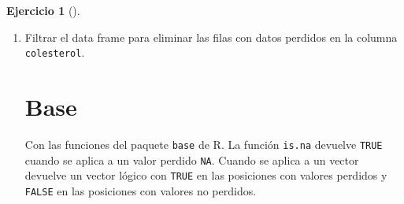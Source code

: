 \documentclass[
  spanish,
  a4paper,
]{scrreport}
\theoremstyle{definition}
\newtheorem{exercise}{Ejercicio}[chapter]
\theoremstyle{remark}
\begin{document}
\begin{exercise}[]
\begin{enumerate}
\begin{tcolorbox}
\begin{verbatim}
# A tibble: 12 x 8
   nombre                      edad sexo   peso altura colesterol   imc Obesidad
   <chr>                      <dbl> <chr> <dbl>  <dbl>      <dbl> <dbl> <fct>   
 1 José Luis Martínez Izquie~    18 H        85   1.79        182    27 Sobrepe~
 2 Rosa Díaz Díaz                32 M        65   1.73        232    22 Saludab~
 3 Carmen López Pinzón           35 M        65   1.7         200    22 Saludab~
 4 Marisa López Collado          46 M        51   1.58        148    20 Saludab~
 5 Antonio Ruiz Cruz             68 H        66   1.74        249    22 Saludab~
 6 Antonio Fernández Ocaña       51 H        62   1.72        276    21 Saludab~
 7 Pedro Gálvez Tenorio          35 H        90   1.94        241    24 Saludab~
 8 Santiago Reillo Manzano       46 H        75   1.85        280    22 Saludab~
 9 Macarena Álvarez Luna         53 M        55   1.62        262    21 Saludab~
10 José María de la Guía Sanz    58 H        78   1.87        198    22 Saludab~
11 Miguel Angel Cuadrado Gut~    27 H       109   1.98        210    28 Sobrepe~
12 Carolina Rubio Moreno         20 M        61   1.77        194    19 Saludab~
\end{verbatim}

  \end{tcolorbox}
\item
  Filtrar el data frame para eliminar las filas con datos perdidos en la
  columna \texttt{colesterol}.

  \begin{tcolorbox}[enhanced jigsaw, titlerule=0mm, arc=.35mm, rightrule=.15mm, opacitybacktitle=0.6, leftrule=.75mm, colframe=quarto-callout-tip-color-frame, toptitle=1mm, breakable, colbacktitle=quarto-callout-tip-color!10!white, bottomrule=.15mm, colback=white, left=2mm, bottomtitle=1mm, opacityback=0, title=\textcolor{quarto-callout-tip-color}{\faLightbulb}\hspace{0.5em}{Solución}, toprule=.15mm, coltitle=black]

  \section{Base}

  Con las funciones del paquete \texttt{base} de R. La función
  \texttt{is.na} devuelve \texttt{TRUE} cuando se aplica a un valor
  perdido \texttt{NA}. Cuando se aplica a un vector devuelve un vector
  lógico con \texttt{TRUE} en las posiciones con valores perdidos y
  \texttt{FALSE} en las posiciones con valores no perdidos.


\end{tcolorbox}
\end{enumerate}
\end{exercise}
\end{document}
